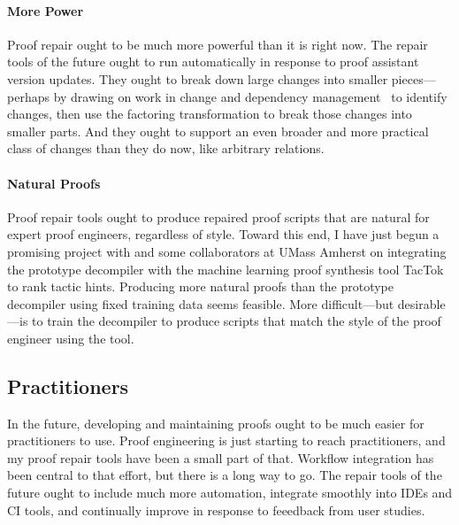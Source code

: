 \paragraph{More Power} 
Proof repair ought to be much more powerful than it is right now.
The repair tools of the future ought to run automatically in response to proof assistant version updates.
They ought to break down large changes into smaller pieces---perhaps by drawing on work in change and 
dependency management~\cite{873647, Autexier:2010:CMH:1986659.1986663, Celik:2017:IRP:3155562.3155588} to identify changes, then use the factoring transformation
to break those changes into smaller parts.
And they ought to support an even broader and more practical class of changes than they do now,
like arbitrary relations.

\paragraph{Natural Proofs}
Proof repair tools ought to produce repaired proof scripts that are natural for expert proof engineers,
regardless of style.
Toward this end, I have just begun a promising project with  and some collaborators at UMass Amherst
on integrating the prototype decompiler with the machine learning proof synthesis tool TacTok~\cite{10.1145/3428299} to rank tactic hints.
Producing more natural proofs than the prototype decompiler using fixed training data seems feasible.
More difficult---but desirable---is to train the decompiler to produce scripts that match the style of the proof engineer using the tool.

\subsection*{Practitioners}

In the future, developing and maintaining proofs ought to be much easier for practitioners to use.
Proof engineering is just starting to reach practitioners, and my proof repair tools have been a small part of that.
Workflow integration has been central to that effort, but there is a long way to go.
The repair tools of the future ought to include much more automation,
integrate smoothly into IDEs and CI tools,
and continually improve in response to feeedback from user studies.

